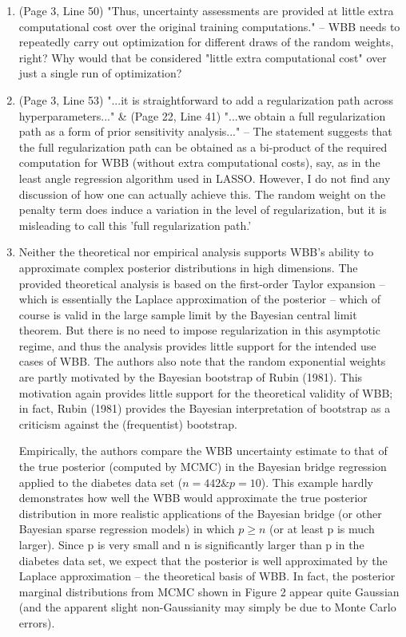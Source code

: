 \documentclass[11pt]{article}
\begin{document}
\begin{enumerate}
\item (Page 3, Line 50) "Thus, uncertainty assessments are provided at little extra computational cost over the original training computations." -- WBB needs to repeatedly carry out optimization for different draws of the random weights, right? Why would that be considered "little extra computational cost" over just a single run of optimization?

\item (Page 3, Line 53) "...it is straightforward to add a regularization path across hyperparameters..." \& (Page 22, Line 41) "...we obtain a full regularization path as a form of prior sensitivity analysis..." -- The statement suggests that the full regularization path can be obtained as a bi-product of the required computation for WBB (without extra computational costs), say, as in the least angle regression algorithm used in LASSO. However, I do not find any discussion of how one can actually achieve this. The random weight on the penalty term does induce a variation in the level of regularization, but it is misleading to call this 'full regularization path.'

\item Neither the theoretical nor empirical analysis supports WBB's ability to approximate complex posterior distributions in high dimensions. The provided theoretical analysis is based on the first-order Taylor expansion -- which is essentially the Laplace approximation of the posterior -- which of course is valid in the large sample limit by the Bayesian central limit theorem. But there is no need to impose regularization in this asymptotic regime, and thus the analysis provides little support for the intended use cases of WBB. The authors also note that the random exponential weights are partly motivated by the Bayesian bootstrap of Rubin (1981). This motivation again provides little support for the theoretical validity of WBB; in fact, Rubin (1981) provides the Bayesian interpretation of bootstrap as a criticism against the (frequentist) bootstrap.

Empirically, the authors compare the WBB uncertainty estimate to that of the true posterior (computed by MCMC) in the Bayesian bridge regression applied to the diabetes data set ($n = 442 \& p = 10$). This example hardly demonstrates how well the WBB would approximate the true posterior distribution in more realistic applications of the Bayesian bridge (or other Bayesian sparse regression models) in which $p\geq n$ (or at least p is much larger). Since p is very small and n is significantly larger than p in the diabetes data set, we expect that the posterior is well approximated by the Laplace approximation -- the theoretical basis of WBB. In fact, the posterior marginal distributions from MCMC shown in Figure 2 appear quite Gaussian (and the apparent slight non-Gaussianity may simply be due to Monte Carlo errors).


\end{enumerate}
\end{document}
